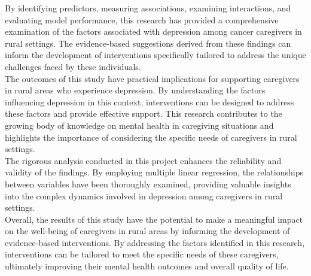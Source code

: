 \documentclass[12pt]{article}
\begin{document}
	\noindent By identifying predictors, measuring associations, examining interactions, and evaluating model performance, this research has provided a comprehensive examination of the factors associated with depression among cancer caregivers in rural settings. The evidence-based suggestions derived from these findings can inform the development of interventions specifically tailored to address the unique challenges faced by these individuals.\\
	
	\noindent The outcomes of this study have practical implications for supporting caregivers in rural areas who experience depression. By understanding the factors influencing depression in this context, interventions can be designed to address these factors and provide effective support. This research contributes to the growing body of knowledge on mental health in caregiving situations and highlights the importance of considering the specific needs of caregivers in rural settings.\\

	\noindent The rigorous analysis conducted in this project enhances the reliability and validity of the findings. By employing multiple linear regression, the relationships between variables have been thoroughly examined, providing valuable insights into the complex dynamics involved in depression among caregivers in rural settings.\\
	
	\noindent Overall, the results of this study have the potential to make a meaningful impact on the well-being of caregivers in rural areas by informing the development of evidence-based interventions. By addressing the factors identified in this research, interventions can be tailored to meet the specific needs of these caregivers, ultimately improving their mental health outcomes and overall quality of life.
	\ne
\end{document}
